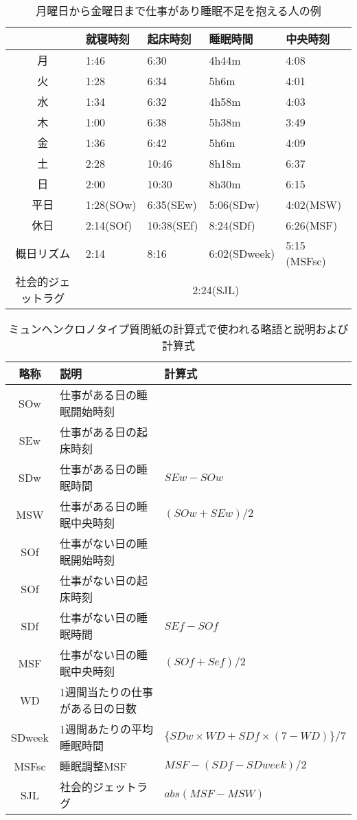 \begin{table}[htbp]
	\begin{center}
	\begin{tabular}{|c|l|l|l|l|}
  	\hline
  	 & 就寝時刻 & 起床時刻 & 睡眠時間 & 中央時刻\\
	\hline
	 月 & 1:46 & 6:30 & 4h44m & 4:08 \\
	 火 & 1:28 & 6:34 & 5h6m & 4:01 \\
	 水 & 1:34 & 6:32 & 4h58m & 4:03 \\
	 木 & 1:00 & 6:38 & 5h38m & 3:49 \\
	 金 & 1:36 & 6:42 & 5h6m & 4:09 \\
	 土 & 2:28 & 10:46 & 8h18m & 6:37 \\
	 日 & 2:00 & 10:30 & 8h30m & 6:15 \\
	 \hline
	 平日 & 1:28(SOw) & 6:35(SEw) & 5:06(SDw) & 4:02(MSW) \\
	 休日 & 2:14(SOf) & 10:38(SEf) & 8:24(SDf) & 6:26(MSF) \\
	 \hline
	 概日リズム & 2:14 & 8:16 & 6:02(SDweek) & 5:15 (MSFsc) \\
	 \hline
	 社会的ジェットラグ & \multicolumn{4}{c|}{2:24(SJL)} \\
	 \hline
 	\end{tabular}
 	\end{center}
 	\caption{月曜日から金曜日まで仕事があり睡眠不足を抱える人の例}
 	\label{mctq_example}
\end{table}

\begin{table}[htbp]
	\begin{center}
	\begin{tabular}{|c|l|l|}
  	\hline
  	略称 & 説明 & 計算式\\
  	\hline
  	SOw & 仕事がある日の睡眠開始時刻 & \\
	SEw & 仕事がある日の起床時刻 & \\
	SDw & 仕事がある日の睡眠時間 & $ SEw - SOw $\\
	MSW & 仕事がある日の睡眠中央時刻 & $ (SOw + SEw) / 2 $\\
	SOf & 仕事がない日の睡眠開始時刻 & \\ 
	SOf & 仕事がない日の起床時刻 & \\
	SDf & 仕事がない日の睡眠時間 & $ SEf - SOf $\\
	MSF & 仕事がない日の睡眠中央時刻 & $(SOf + Sef) /2 $\\
	WD &  1週間当たりの仕事がある日の日数 & \\
	SDweek & 1週間あたりの平均睡眠時間 & $\{SDw × WD + SDf × (7 - WD)\} / 7 $\\
	MSFsc & 睡眠調整MSF & $ MSF - (SDf - SDweek)/ 2 $\\
	SJL & 社会的ジェットラグ & $abs(MSF - MSW)$ \\
	\hline
 	\end{tabular}
 	\end{center}
 	\caption{ミュンヘンクロノタイプ質問紙の計算式で使われる略語と説明および計算式\cite{mctqjp}}
 	\label{mctq}
\end{table}

